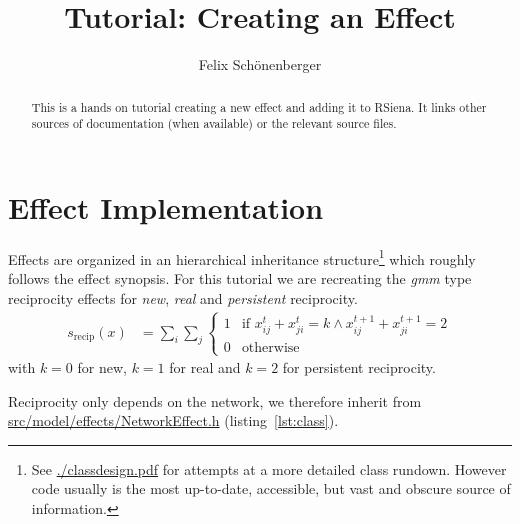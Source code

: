 \documentclass{tufte-handout}
\title{Tutorial: Creating an Effect}
\author{Felix Schönenberger}
\newcommand\sourcelinkF[2]{\href{../#1/#2}{\mbox{#1/}\mbox{#2}}}
\begin{document}
\maketitle

\begin{abstract}
This is a hands on tutorial creating a new effect and adding it to RSiena.
It links other sources of documentation (when available) or the relevant source files.
\end{abstract}

\section{Effect Implementation}

Effects are organized in an hierarchical inheritance structure\footnote{See \url{./classdesign.pdf} for attempts at a more detailed class rundown. However code usually is the most up-to-date, accessible, but vast and obscure source of information.} which roughly follows the effect synopsis.
For this tutorial we are recreating the \emph{gmm} type reciprocity effects for \emph{new}, \emph{real} and \emph{persistent} reciprocity.
\begin{align}\label{eq:def}
  s_{\text{recip}}(x) &= \sum_i \sum_j \left\{\begin{array}{ll}
     1 & \text{if } x^{t}_{ij}+x^{t}_{ji}=k \wedge x^{t+1}_{ij}+x^{t+1}_{ji}=2\\
     0 & \text{otherwise}
  \end{array}\right.
\end{align}
with $k=0$ for new, $k=1$ for real and $k=2$ for persistent reciprocity.

Reciprocity only depends on the network, we therefore inherit from \sourcelinkF{src/model/effects}{NetworkEffect.h} (listing~\ref{lst:class}).
\end{document}
